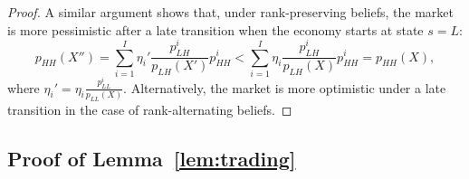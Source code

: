 \begin{proof}
A similar argument shows that, under rank-preserving beliefs, the market is more pessimistic after a late transition when the economy starts at state $s = L$:
\begin{equation}
    p_{HH}(X'') = \sum_{i=1}^I \eta_i' \frac{p_{LH}^i}{p_{LH}(X')} p_{HH}^i < \sum_{i=1}^I \eta_i \frac{p_{LH}^i}{p_{LH}(X)} p_{HH}^i= p_{HH}(X),
\end{equation}
where $\eta_i' = \eta_i \frac{p_{LL}^i}{p_{LL}(X)}$. Alternatively, the market is more optimistic under a late transition in the case of rank-alternating beliefs.

\end{proof}


\subsection{Proof of Lemma~\ref{lem:trading}}\label{app: proof_lemma_trading}
